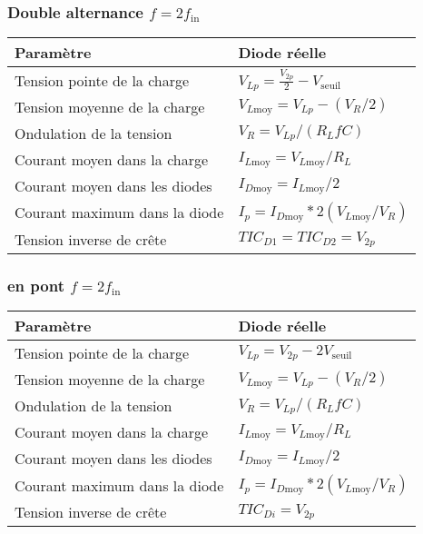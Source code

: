 \subsubsection{Double alternance $f=2f_{\mathrm{in}}$}
\begin{tabular}{ll}
    Paramètre & Diode réelle \\\hline
    Tension pointe de la charge & \(V_{Lp}=\frac{V_{2p}}{2}-V_{\mathrm{seuil}}\)\\
    Tension moyenne de la charge & \(V_{L\mathrm{moy}}=V_{Lp}-(V_R /2)\)\\
    Ondulation de la tension & \(V_{R}=V_{Lp}/(R_L f C)\)\\
    Courant moyen dans la charge & \(I_{L\mathrm{moy}}=V_{L\mathrm{moy}}/R_{L} \)\\
    Courant moyen dans les diodes &  \(I_{D\mathrm{moy}}=I_{L\mathrm{moy}}/2\)\\
    Courant maximum dans la diode & \(I_p=I_{D\mathrm{moy}}*2(V_{L\mathrm{moy}} / V_R)\)\\
    Tension inverse de crête & \(TIC_{D1} = TIC_{D2}=V_{2p}\)
\end{tabular}

\subsubsection{en pont $f=2f_{\mathrm{in}}$}
\begin{center}
    
\end{center}
\begin{tabular}{ll}
    Paramètre & Diode réelle \\\hline
    Tension pointe de la charge & \(V_{Lp}=V_{2p}-2V_{\mathrm{seuil}}\)\\
    Tension moyenne de la charge & \(V_{L\mathrm{moy}}=V_{Lp}-(V_R /2)\)\\
    Ondulation de la tension & \(V_{R}=V_{Lp}/(R_L f C)\)\\
    Courant moyen dans la charge & \(I_{L\mathrm{moy}}= V_{L\mathrm{moy}} / R_L\)\\
    Courant moyen dans les diodes &  \(I_{D\mathrm{moy}}=I_{L\mathrm{moy}}/2\)\\
    Courant maximum dans la diode & \(I_p=I_{D\mathrm{moy}}*2(V_{L\mathrm{moy}} / V_R)\)\\
    Tension inverse de crête & \(TIC_{Di}=V_{2p}\)
\end{tabular}
